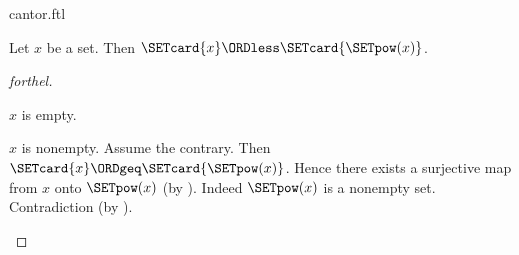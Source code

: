 \documentclass{naproche-library}
\begin{document}
\begin{smodule}[title=Cantor's Theorem]{cantor.ftl}

\begin{theorem}[forthel,title=Cantor's Theorem,id=cantor_389275382172394]
  Let $x$ be a set.
  Then $\SETcard{x} \ORDless \SETcard{\SETpow(x)}$.
\end{theorem}
\begin{proof}[forthel]
  \begin{case}{$x$ is empty.} \end{case}

  \begin{case}{$x$ is nonempty.}
    Assume the contrary.
    Then $\SETcard{x} \ORDgeq \SETcard{\SETpow(x)}$.
    Hence there exists a surjective map from $x$ onto $\SETpow(x)$ (by ).
    Indeed $\SETpow(x)$ is a nonempty set.
    Contradiction (by ).
  \end{case}
\end{proof}
\end{smodule}
\end{document}
